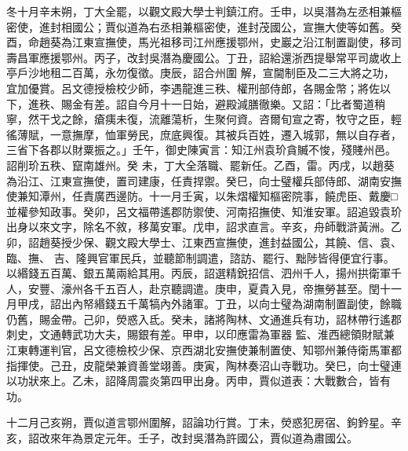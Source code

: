 \begin{pinyinscope}
 冬十月辛未朔，丁大全罷，以觀文殿大學士判鎮江府。壬申，以吳潛為左丞相兼樞密使，進封相國公；賈似道為右丞相兼樞密使，進封茂國公，宣撫大使等如舊。癸酉，命趙葵為江東宣撫使，馬光祖移司江州應援鄂州，史巖之沿江制置副使，移司壽昌軍應援鄂州。丙子，改封吳潛為慶國公。丁丑，詔給還浙西提舉常平司歲收上亭戶沙地租二百萬，永勿復徵。庚辰，詔合州圍
 解，宣閫制臣及二三大將之功，宜加優賞。呂文德授檢校少師，李遇龍進三秩、權刑部侍郎，各賜金幣；將佐以下，進秩、賜金有差。詔自今月十一日始，避殿減膳徹樂。又詔：「比者蜀道稍寧，然干戈之餘，瘡痍未復，流離蕩析，生聚何資。咨爾旬宣之寄，牧守之臣，輕徭薄賦，一意撫摩，恤軍勞民，庶底興復。其被兵百姓，遷入城郭，無以自存者，三省下各郡以財粟振之。」壬午，御史陳寅言：知江州袁玠貪贓不悛，殘賤州邑。詔削玠五秩、竄南雄州。癸
 未，丁大全落職、罷新任。乙酉，雷。丙戌，以趙葵為沿江、江東宣撫使，置司建康，任責捍禦。癸巳，向士璧權兵部侍郎、湖南安撫使兼知潭州，任責廣西邊防。十一月壬寅，以朱熠權知樞密院事，饒虎臣、戴慶□並權參知政事。癸卯，呂文福帶遙郡防禦使、河南招撫使、知淮安軍。詔追毀袁玠出身以來文字，除名不敘，移萬安軍。戊申，詔求直言。辛亥，舟師戰滸黃洲。乙卯，詔趙葵授少保、觀文殿大學士、江東西宣撫使，進封益國公，其饒、信、袁、臨、撫、
 吉、隆興官軍民兵，並聽節制調遣，諮訪、罷行、黜陟皆得便宜行事。以緡錢五百萬、銀五萬兩給其用。丙辰，詔選精銳招信、泗州千人，揚州拱衛軍千人，安豐、濠州各千五百人，赴京聽調遣。庚申，夏貴入見，帝撫勞甚至。閏十一月甲戌，詔出內帑緡錢五千萬犒內外諸軍。丁丑，以向士璧為湖南制置副使，餘職仍舊，賜金帶。己卯，熒惑入氐。癸未，諸將陶林、文通進兵有功，詔林帶行遙郡刺史，文通轉武功大夫，賜銀有差。甲申，以印應雷為軍器
 監、淮西總領財賦兼江東轉運判官，呂文德檢校少保、京西湖北安撫使兼制置使、知鄂州兼侍衛馬軍都指揮使。己丑，皮龍榮兼資善堂翊善。庚寅，陶林奏沼山寺戰功。癸巳，向士璧連以功狀來上。乙未，詔降周震炎第四甲出身。丙申，賈似道表：大戰數合，皆有功。



 十二月己亥朔，賈似道言鄂州圍解，詔論功行賞。丁未，熒惑犯房宿、鉤鈐星。辛亥，詔改來年為景定元年。壬子，改封吳潛為許國公，賈似道為肅國公。



\end{pinyinscope}